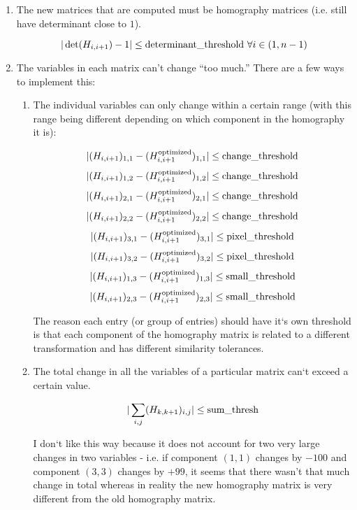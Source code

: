 \documentclass{article}
\begin{document}
\begin{enumerate}

\item The new matrices that are computed must be homography matrices (i.e.
still have determinant close to $1$).

\[|\det(H_{i, i+1}) - 1| \leq \textnormal{determinant\_threshold } \forall i \in (1, n-1)\] 

\item The variables in each matrix can't change ``too much.'' There are a few
ways to implement this:

\begin{enumerate}

\item \label{indiv_thresh} The individual variables can only change within a certain range (with
this range being different depending on which component in the homography it
is):

\[|(H_{i, i+1})_{1, 1} - (H_{i, i+1}^{\textnormal{optimized}})_{1, 1}| \leq \textnormal{change\_threshold}\] 
\[|(H_{i, i+1})_{1, 2} - (H_{i, i+1}^{\textnormal{optimized}})_{1, 2}| \leq \textnormal{change\_threshold}\] 
\[|(H_{i, i+1})_{2, 1} - (H_{i, i+1}^{\textnormal{optimized}})_{2, 1}| \leq \textnormal{change\_threshold}\] 
\[|(H_{i, i+1})_{2, 2} - (H_{i, i+1}^{\textnormal{optimized}})_{2, 2}| \leq \textnormal{change\_threshold}\] 
\[|(H_{i, i+1})_{3, 1} - (H_{i, i+1}^{\textnormal{optimized}})_{3, 1}| \leq \textnormal{pixel\_threshold}\] 
\[|(H_{i, i+1})_{3, 2} - (H_{i, i+1}^{\textnormal{optimized}})_{3, 2}| \leq \textnormal{pixel\_threshold}\] 
\[|(H_{i, i+1})_{1, 3} - (H_{i, i+1}^{\textnormal{optimized}})_{1, 3}| \leq \textnormal{small\_threshold}\] 
\[|(H_{i, i+1})_{2, 3} - (H_{i, i+1}^{\textnormal{optimized}})_{2, 3}| \leq \textnormal{small\_threshold}\] 

The reason each entry (or group of entries) should have it`s own threshold is
that each component of the homography matrix is related to a different
transformation and has different similarity tolerances. 

\item The total change in all the variables of a particular matrix can`t exceed a certain value.

\[|\sum_{i, j} (H_{k, k+1})_{i, j}| \leq \textnormal{sum\_thresh}\]

I don`t like this way because it does not account for two very large changes in
two variables - i.e. if component $(1, 1)$ changes by $-100$ and component $(3,
3)$ changes by $+99$, it seems that there wasn't that much change in total
whereas in reality the new homography matrix is very different from the old
homography matrix.


\end{enumerate}
\end{enumerate}
\end{document}
